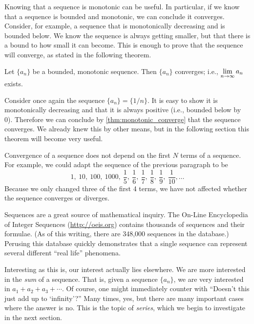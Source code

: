 Knowing that a sequence is monotonic can be useful. In particular, if we know that a sequence is bounded and monotonic, we can conclude it converges. Consider, for example, a sequence that is monotonically decreasing and is bounded below. We know the sequence is always getting smaller, but that there is a bound to how small it can become. This is enough to prove that the sequence will converge, as stated in the following theorem.

\begin{theorem}\label{thm:monotonic_converge}%
Let $\{a_n\}$ be a bounded, monotonic sequence. Then $\{a_n\}$ converges; i.e., $\displaystyle \lim_{n \to\infty}a_n$ exists.
\end{theorem}

Consider once again the sequence $\{a_n\} = \{1/n\}$. It is easy to show it is monotonically decreasing and that it is always positive (i.e., bounded below by 0). Therefore we can conclude by \autoref{thm:monotonic_converge} that the sequence converges. We already knew this by other means, but in the following section this theorem will become very useful.

Convergence of a sequence does not depend on the first $N$ terms of a sequence.  For example, we could adapt the sequence of the previous paragraph to be
\[
 1,\ 10,\ 100,\ 1000,\ \frac15,\ \frac16,\ \frac17,\ \frac18,\ \frac19,\ \frac1{10},
 \dotsc
\]
Because we only changed three of the first 4 terms, we have not affected whether the sequence converges or diverges.

Sequences are a great source of mathematical inquiry. The On-Line Encyclopedia of Integer Sequences (\url{http://oeis.org}) contains thousands of sequences and their formulae. (As of this writing, there are 348,000 sequences in the database.) Perusing this database quickly demonstrates that a single sequence can represent several different ``real life'' phenomena. 

Interesting as this is, our interest actually lies elsewhere. We are more interested in the \emph{sum} of a sequence. That is, given a sequence $\{a_n\}$, we are very interested in $a_1+a_2+a_3+\dotsb$. Of course, one might immediately counter with ``Doesn't this just add up to `infinity'?'' Many times, yes, but there are many important cases where the answer is no. This is the topic of \emph{series}, which we begin to investigate in the next section.

